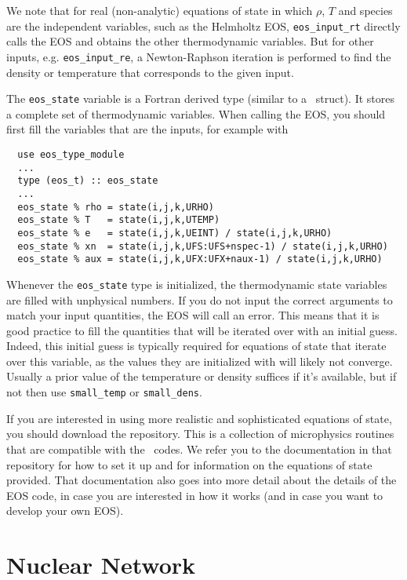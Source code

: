 We note that for real (non-analytic) equations of state
in which $\rho$, $T$ and species are the independent variables, such
as the Helmholtz EOS, {\tt eos\_input\_rt} directly calls the EOS
and obtains the other thermodynamic variables. But for other inputs,
e.g. {\tt eos\_input\_re}, a Newton-Raphson iteration is performed
to find the density or temperature that corresponds to the given
input.

The {\tt eos\_state} variable is a Fortran derived type (similar to
a \cpp\ struct). It stores a complete set of thermodynamic
variables. When calling the EOS, you should first fill the variables
that are the inputs, for example with
\begin{verbatim}
  use eos_type_module
  ...
  type (eos_t) :: eos_state
  ...
  eos_state % rho = state(i,j,k,URHO)
  eos_state % T   = state(i,j,k,UTEMP)
  eos_state % e   = state(i,j,k,UEINT) / state(i,j,k,URHO)
  eos_state % xn  = state(i,j,k,UFS:UFS+nspec-1) / state(i,j,k,URHO)
  eos_state % aux = state(i,j,k,UFX:UFX+naux-1) / state(i,j,k,URHO)
\end{verbatim}
Whenever the \texttt{eos\_state} type is initialized, the
thermodynamic state variables are filled with unphysical numbers. If
you do not input the correct arguments to match your input quantities,
the EOS will call an error. This means that it is good
practice to fill the quantities that will be iterated over with an
initial guess. Indeed, this initial guess is typically required for
equations of state that iterate over this variable, as the values
they are initialized with will likely not
converge. Usually a prior value of the temperature or density suffices
if it's available, but if not then use \texttt{small\_temp} or
\texttt{small\_dens}.

If you are interested in using more realistic and sophisticated equations of
state, you should download the \href{https://github.com/BoxLib-Codes/Microphysics}{\microphysics}
repository. This is a collection of microphysics routines that are compatible with the
\boxlib\ codes. We refer you to the documentation in that repository for how to set it up
and for information on the equations of state provided. That documentation
also goes into more detail about the details of the EOS code, in case you are interested in
how it works (and in case you want to develop your own EOS).

\section{Nuclear Network}

